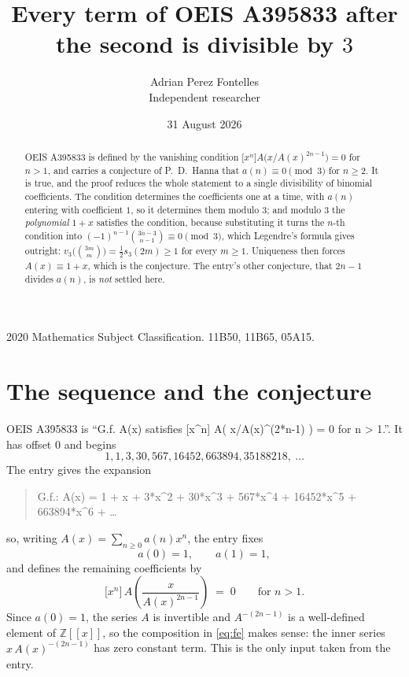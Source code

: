 \documentclass[11pt,a4paper]{article}
\title{Every term of OEIS A395833 after the second is divisible by $3$}
\author{Adrian Perez Fontelles\\ \small Independent researcher}
\date{31 August 2026}
\theoremstyle{plain}
\theoremstyle{definition}
\begin{document}
\maketitle

\begin{abstract}
OEIS A395833 is defined by the vanishing condition
$\bigl[x^{n}\bigr]A\bigl(x/A(x)^{2n-1}\bigr)=0$ for $n>1$, and carries a conjecture of
P.~D.~Hanna that $a(n)\equiv0\pmod3$ for $n\ge2$. It is true, and the proof reduces the
whole statement to a single divisibility of binomial coefficients. The condition determines
the coefficients one at a time, with $a(n)$ entering with coefficient $1$, so it determines
them modulo $3$; and modulo $3$ the \emph{polynomial} $1+x$ satisfies the condition,
because substituting it turns the $n$-th condition into
$(-1)^{n-1}\binom{3n-3}{n-1}\equiv0\pmod3$, which Legendre's formula gives outright:
$v_3\bigl(\binom{3m}{m}\bigr)=\tfrac12 s_3(2m)\ge1$ for every $m\ge1$. Uniqueness then
forces $A(x)\equiv1+x$, which is the conjecture. The entry's other conjecture, that $2n-1$
divides $a(n)$, is \emph{not} settled here.
\end{abstract}

\noindent\small 2020 Mathematics Subject Classification. 11B50, 11B65, 05A15.\normalsize

\section{The sequence and the conjecture}

OEIS A395833 is ``G.f. A(x) satisfies [x\^{}n] A( x/A(x)\^{}(2*n-1) ) = 0 for n > 1.''. It has offset $0$ and begins
\[
1, 1, 3, 30, 567, 16452, 663894, 35188218,\ \dots
\]
The entry gives the expansion
\begin{quote}\small
G.f.: A(x) = 1 + x + 3*x\^{}2 + 30*x\^{}3 + 567*x\^{}4 + 16452*x\^{}5 + 663894*x\^{}6 + \dots
\end{quote}
so, writing $A(x)=\sum_{n\ge0}a(n)x^{n}$, the entry fixes
\begin{equation}\label{eq:init}
a(0)=1,\qquad a(1)=1,
\end{equation}
and defines the remaining coefficients by
\begin{equation}\label{eq:fe}
\bigl[x^{n}\bigr]\,A\!\left(\frac{x}{A(x)^{2n-1}}\right)\;=\;0
\qquad\text{for } n>1 .
\end{equation}
Since $a(0)=1$, the series $A$ is invertible and $A^{-(2n-1)}$ is a well-defined element of
$\mathbb{Z}[[x]]$, so the composition in \eqref{eq:fe} makes sense: the inner series
$x\,A(x)^{-(2n-1)}$ has zero constant term. This is the only input taken from the entry.
\end{document}
